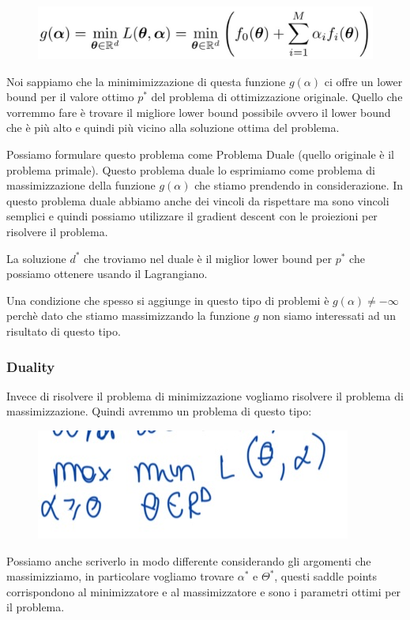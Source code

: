 \documentclass[14pt]{extreport}
\begin{document}
\begin{figure}[H]
\centering
\includegraphics[width=0.7\linewidth]{303.jpeg}
\end{figure}

Noi sappiamo che la minimimizzazione di questa funzione $g(\alpha)$ ci offre un lower bound per il valore ottimo $p^*$ del problema di ottimizzazione
originale. Quello che vorremmo fare è trovare il migliore lower bound possibile ovvero il lower bound che è più alto e quindi più vicino alla
soluzione ottima del problema.

Possiamo formulare questo problema come Problema Duale (quello originale è il problema primale). Questo problema duale lo esprimiamo come problema di
massimizzazione della funzione $g(\alpha)$ che stiamo prendendo in considerazione. In questo problema duale abbiamo anche dei vincoli da rispettare ma
sono vincoli semplici e quindi possiamo utilizzare il gradient descent con le proiezioni per risolvere il problema.

La soluzione $d^*$ che troviamo nel duale è il miglior lower bound per $p^*$ che possiamo ottenere usando il Lagrangiano.

Una condizione che spesso si aggiunge in questo tipo di problemi è $g(\alpha) \neq -\infty$ perchè dato che stiamo massimizzando la funzione $g$ non
siamo interessati ad un risultato di questo tipo.

\subsubsection{Duality}

Invece di risolvere il problema di minimizzazione vogliamo risolvere il problema di massimizzazione. Quindi avremmo un problema di questo tipo:

\begin{figure}[H]
\centering
\includegraphics[width=0.3\linewidth]{309.jpeg}
\end{figure}

Possiamo anche scriverlo in modo differente considerando gli argomenti che massimizziamo, in particolare vogliamo trovare $\alpha^*$ e $\Theta^*$,
questi saddle points corrispondono al minimizzatore e al massimizzatore e sono i parametri ottimi per il problema.
\end{document}
